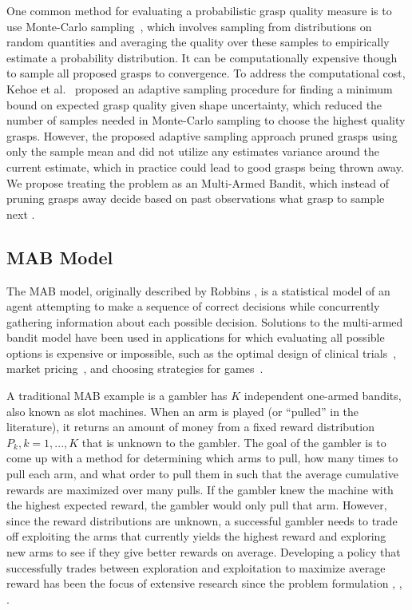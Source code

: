 \documentclass[journal,transmag]{IEEEtran}%
\begin{document}
One common method for evaluating a probabilistic grasp quality measure is to use Monte-Carlo sampling~\cite{christopoulos2007handling, kehoe2012estimating, kehoe2012toward}, which involves sampling from distributions on random quantities and averaging the quality over these samples to empirically estimate a probability distribution\cite{caflisch1998monte}. It can be computationally expensive though to sample all proposed grasps to convergence.  To  address the computational cost, Kehoe et al.~\cite{kehoe2012estimating} proposed an adaptive sampling procedure for finding a minimum bound on expected grasp quality given shape uncertainty, which reduced the number of samples needed in Monte-Carlo sampling to choose the highest quality grasps. However, the proposed adaptive sampling approach pruned grasps using only the sample mean and did not utilize any estimates variance around the current estimate, which in practice could lead to good grasps being thrown away. We propose treating the problem as an Multi-Armed Bandit, which instead of pruning grasps away decide based on past observations what grasp to sample next \cite{barto1998reinforcement}.

\subsection{MAB Model}
The MAB model, originally described by Robbins \cite{robbins1985some}, is a statistical model of an agent attempting to make a sequence of correct decisions while concurrently gathering information about each possible decision.
Solutions to the multi-armed bandit model have been used in applications for which evaluating all possible options is expensive or impossible, such as the optimal design of clinical trials~\cite{simon1989optimal}, market pricing~\cite{rothschild1974two}, and choosing strategies for games~\cite{st2012online}. 

A traditional MAB example is a gambler has $K$ independent one-armed bandits, also known as slot machines.
When an arm is played (or ``pulled'' in the literature), it returns an amount of money from a fixed reward distribution $P_k, k = 1, ..., K$ that is unknown to the gambler.
The goal of the gambler is to come up with a method for determining which arms to pull, how many times to pull each arm, and what order to pull them in such that the average cumulative rewards are maximized over many pulls.
If the gambler knew the machine with the highest expected reward, the gambler would only pull that arm.
However, since the reward distributions are unknown, a successful gambler needs to trade off exploiting the arms that currently yields the highest reward and exploring new arms to see if they give better rewards on average.
Developing a policy that successfully trades between exploration and exploitation to maximize average reward has been the focus of extensive research since the problem formulation \cite{bubeck2009pure}, \cite{robbins1985some}, \cite{bergemann2006bandit}.
\end{document}
